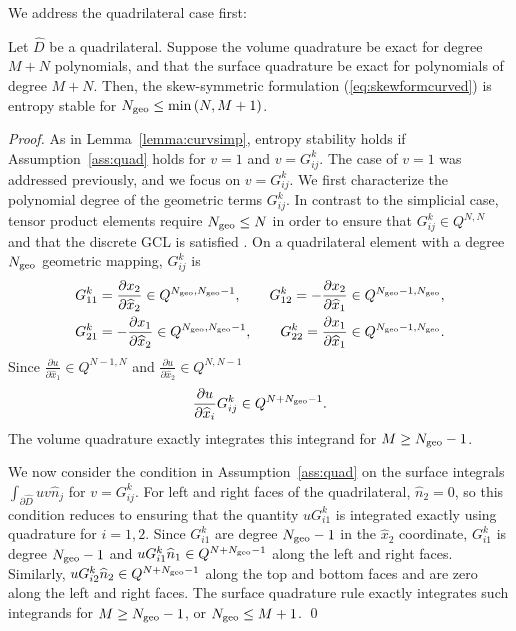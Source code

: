 \documentclass{svjour3}                     %
\renewcommand{\hat}{\widehat}
\newcommand{\pd}[2]{\frac{\partial#1}{\partial#2}}
\newcommand{\LRp}[1]{\left( #1 \right)}
\begin{document}
We address the quadrilateral case first:
\begin{lemma}
Let $\hat{D}$ be a quadrilateral.  Suppose the volume quadrature be exact for degree $M+N$ polynomials, and that the surface quadrature be exact for polynomials of degree $M+N$.  Then, the skew-symmetric formulation (\ref{eq:skewformcurved}) is entropy stable for $N_{\rm geo} \leq \min\LRp{N,M+1}$.
\label{lemma:curvquad}
\end{lemma}
\begin{proof}
As in Lemma~\ref{lemma:curvsimp}, entropy stability holds if Assumption~\ref{ass:quad} holds for $v = 1$ and $v = G^k_{ij}$.  The case of $v = 1$ was addressed previously, and we focus on $v = G^k_{ij}$.  We first characterize the polynomial degree of the geometric terms $G^k_{ij}$.  In contrast to the simplicial case, tensor product elements require $N_{\rm geo}\leq N$ in order to ensure that $G^k_{ij}\in Q^{N,N}$ and that the discrete GCL is satisfied \cite{kopriva2006metric}.  On a quadrilateral element with a degree $N_{\rm geo}$ geometric mapping, $G^k_{ij}$ is
\begin{align*}
G^k_{11} &= \pd{x_2}{\hat{x}_2} \in Q^{N_{\rm geo}, N_{\rm geo}-1}, \qquad G^k_{12} = -\pd{x_2}{\hat{x}_1} \in Q^{N_{\rm geo}-1, N_{\rm geo}},\\
G^k_{21} &= -\pd{x_1}{\hat{x}_2} \in Q^{N_{\rm geo}, N_{\rm geo}-1}, \qquad G^k_{22} = \pd{x_1}{\hat{x}_1}\in Q^{N_{\rm geo}-1, N_{\rm geo}}.\nonumber
\end{align*}
Since $\pd{u}{\hat{x}_1} \in Q^{N-1,N}$ and $\pd{u}{\hat{x}_2} \in Q^{N,N-1}$
\[
\pd{u}{\hat{x}_i}G^k_{ij} \in Q^{N+N_{\rm geo}-1}.%
\]
The volume quadrature exactly integrates this integrand for $M \geq N_{\rm geo}-1$.

We now consider the condition in Assumption~\ref{ass:quad} on the surface integrals $\int_{\partial \hat{D}} u v \hat{n}_j$ for $v= G^k_{ij}$.  For left and right faces of the quadrilateral, $\hat{n}_2 = 0$, so this condition reduces to ensuring that the quantity $u G^k_{i1}$ is integrated exactly using quadrature for $i = 1,2$.  Since $G^k_{i1}$ are degree $N_{\rm geo}-1$ in the $\hat{x}_2$ coordinate, $G^k_{i1}$ is degree $N_{\rm geo}-1$ and $uG^k_{i1} \hat{n}_1 \in Q^{N+N_{\rm geo}-1}$ along the left and right faces.  Similarly, $uG^k_{i2} \hat{n}_2 \in Q^{N+N_{\rm geo}-1}$ along the top and bottom faces and are zero along the left and right faces.  The surface quadrature rule exactly integrates such integrands for $M \geq N_{\rm geo} - 1$, or $N_{\rm geo} \leq M+1$.
\qed\end{proof}
\end{document}
